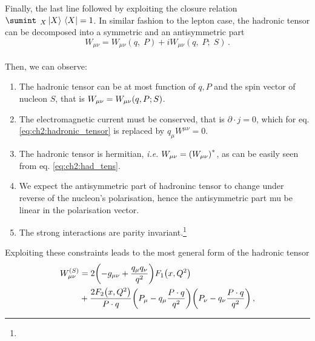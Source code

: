 Finally, the last line followed by exploiting the closure relation $\sumint_{\;\; X} \ket*{X} \bra*{X} = 1 $. In similar fashion to the lepton case, the hadronic tensor can be decomposed into a symmetric and an antisymmetric part
\\
\begin{equation}
    W_{\mu \nu} =  W_{\mu \nu} (q, \;P ) + i W_{\mu \nu} (q, \;P ; \; S ) \,.
\end{equation}
\\
Then, we can observe:
\begin{enumerate}
    \item The hadronic tensor can be at most function of $q, P$ and the spin vector of nucleon $S$, that is $W_{\mu \nu} = W_{\mu \nu}\qty(q,P;S)$.  
    \item The electromagnetic current must be conserved, that is $\partial \cdot j = 0$, which for eq. \eqref{eq:ch2:hadronic_tensor} is replaced by $q_{\mu} W^{\mu \nu} = 0$.
    \item The hadronic tensor is hermitian, \textit{i.e.} $W_{\mu \nu} = \qty(W_{\mu \nu})^{*}$, as can be easily seen from eq. \eqref{eq:ch2:had_tens}. 
    \item We expect the antisymmetric part of hadroninc tensor to change under reverse of the nucleon's polarisation, hence the antisymmetric part mu be linear in the polarisation vector.
    \item The strong interactions are parity invariant.\footnote{
    }
\end{enumerate}
Exploiting these constraints leads to the most general form of the hadronic tensor 
\begin{equation}
  \begin{split}
  W_{\mu \nu}^{(S)} & = 2\qty(-g_{\mu \nu} + \frac{q_{\mu} q_{\nu}}{q^2}) F_1 \qty(x, Q^2) \\
  & + \frac{2 F_2 \qty(x , Q^2) }{P \cdot q} \qty(P_{\mu} - q_{\mu} \frac{P \cdot q}{q^2}) \qty(P_{\nu} - q_{\nu} \frac{P \cdot q}{q^2})\,,
  \label{eq:ch2:had_tens_final_symm}
  \end{split}
\end{equation}
